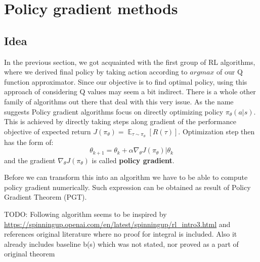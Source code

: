 \section{Policy gradient methods}
\subsection{Idea}
In the previous section, we got acquainted with the first group of RL algorithms, where we derived final policy by taking action according to $argmax$ of our Q function approximator.
Since our objective is to find optimal policy, using this approach of considering Q values may seem a bit indirect.
There is a whole other family of algorithms out there that deal with this very issue.
As the name suggests Policy gradient algorithms focus on directly optimizing policy $\pi_\theta(a|s)$. 
This is achieved by directly taking steps along gradient of the performance objective of expected return $J(\pi_\theta) = \mathop{\mathbb{E}}_{\tau \sim \pi_\theta}[R(\tau)]$.
Optimization step then has the form of:
\[\theta_{k+1} = \theta_k+\alpha  \nabla_\theta J(\pi_\theta)|\theta_k\] and the gradient $\nabla_\theta J(\pi_\theta)$ is called \textbf{policy gradient}.

Before we can transform this into an algorithm we have to be able to compute policy gradient numerically.
Such expression can be obtained as result of Policy Gradient Theorem (PGT).

\par
TODO: Following algorithm seems to be inspired by \url{https://spinningup.openai.com/en/latest/spinningup/rl_intro3.html} and references original literature where no proof for integral is included.
Also it already includes baseline b(s) which was not stated, nor proved as a part of original theorem

